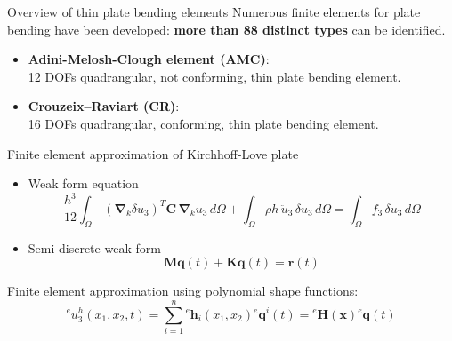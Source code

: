 \documentclass[aspectratio=169]{beamer}
\begin{document}
\begin{frame}{Overview of thin plate bending elements}
  Numerous finite elements for plate bending have been developed: \textbf{more than 88 distinct types} can be identified.
  \begin{center}
  \end{center}
  \begin{itemize}
    \item  \textbf{Adini-Melosh-Clough element (AMC)}: \\ 12 DOFs quadrangular, not conforming, thin plate bending element.
    \item  \textbf{Crouzeix–Raviart (CR)}: \\ 16 DOFs quadrangular, conforming, thin plate bending element.
  \end{itemize}
\end{frame}

\begin{frame}{Finite element approximation of Kirchhoff-Love plate}
  \begin{block}{}
    \begin{itemize}
      \item Weak form equation
            \[
              \frac{h^3}{12}\int_\Omega \, (\boldsymbol{\nabla}_k \delta u_3)^T\mathbf C \, \boldsymbol{\nabla}_k u_3  \, d\Omega + \int_\Omega \rho h\, \ddot u_3 \, \delta u_3 \, d\Omega = \int_\Omega f_3\, \delta u_3 \, d\Omega
            \]
      \item  Semi-discrete weak form
            $$\mathbf M\ddot{\mathbf q}(t)+\mathbf K\mathbf q(t)=\mathbf r(t)$$
    \end{itemize}
  \end{block}
  \vspace{0.3cm}
  Finite element approximation using polynomial shape functions:
  $${}^eu_3^h(x_1, x_2, t) = \sum_{i=1}^{n} {}^e\mathbf h_i(x_1, x_2) {}^e\mathbf  q^i(t) = {}^e\mathbf{H}(\mathbf x){}^e\mathbf{q}(t)$$
\end{frame}
\end{document}
